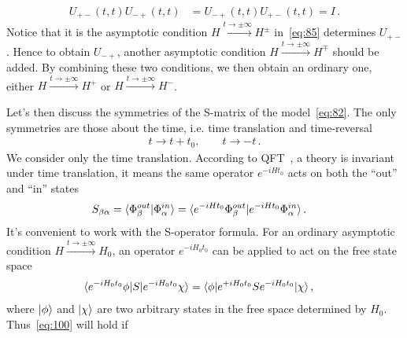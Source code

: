 \documentclass[12pt,a4paper]{article}
\begin{document}
\begin{equation}
\label{eq:98}
\begin{split}
U_{+-}(t,t)U_{-+}(t,t) &= U_{-+}(t,t)U_{+-}(t,t)=I \,.
\end{split}
\end{equation}
Notice that it is the asymptotic condition
$H\stackrel{t\rightarrow\pm \infty}{\longrightarrow} H^{\pm}$ in~\eqref{eq:85} determines $U_{+-}$. Hence to obtain $U_{-+}$, another
asymptotic condition $H\stackrel{t\rightarrow\pm
\infty}{\longrightarrow} H^{\mp}$ should be added. By
combining these two conditions, we then obtain an ordinary one, either $H\stackrel{t\rightarrow\pm
\infty}{\longrightarrow} H^{+}$ or $H\stackrel{t\rightarrow\pm
\infty}{\longrightarrow} H^{-}$.

Let's then discuss the symmetries of the S-matrix of the model~\eqref{eq:82}. The only symmetries are those about the time, i.e. time translation
and time-reversal
\begin{equation}
\label{eq:99}
\begin{split}
t\rightarrow t+t_0,\qquad t\rightarrow -t \,.
\end{split}
\end{equation}
We consider only the time translation. According to
QFT~\cite{m}, a theory is invariant under time translation, it
means the same operator $e^{-iH t_0}$ acts on both the ``out''
and ``in'' states
\begin{equation}
\label{eq:100}
\begin{split}
S_{\beta\alpha} &=
\langle\Phi_{\beta}^{out}\arrowvert\Phi_{\alpha}^{in}\rangle =
\langle e^{-iH t_0}\Phi_{\beta}^{out}\arrowvert e^{-iH
t_0}\Phi_{\alpha}^{in}\rangle \,.
\end{split}
\end{equation}
It's convenient to work with the
S-operator formula. For an ordinary asymptotic
condition $H\stackrel{t\rightarrow\pm \infty}{\longrightarrow}H_0$, an operator $e^{-iH_{0}t_0}$ can be applied to act on the free state space
\begin{equation}
\label{eq:101}
\begin{split}
\langle e^{-iH_{0}t_0}\phi\arrowvert S\arrowvert
e^{-iH_{0}t_0}\chi\rangle &= \langle\phi\arrowvert e^{+iH_{0}
t_0}Se^{-iH_{0}t_0}\arrowvert\chi\rangle \,,
\end{split}
\end{equation}
where $\arrowvert\phi\rangle$ and $\arrowvert\chi\rangle$ are two
arbitrary states in the free space determined by $H_0$. Thus~\eqref{eq:100} will hold if~\cite{m}
\end{document}
